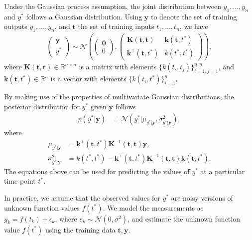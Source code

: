 \documentclass[journal]{IEEEtran}
\begin{document}
Under the Gaussian process assumption, the joint distribution between $y_1, \ldots, y_n$ and $y^*$ follows a Gaussian
distribution. Using $\mathbf{y}$ to denote the set of training outputs $y_1, \ldots, y_n$, and $\mathbf{t}$ the set
of training inputs $t_1, \ldots, t_n$, we have
\begin{align*}
\begin{pmatrix}
\mathbf{y}\\
y^*
\end{pmatrix}\sim
\mathcal{N}
\left(
\begin{pmatrix}
\mathbf{0}\\
0
\end{pmatrix},
\begin{pmatrix}
\mathbf{K}(\mathbf{t}, \mathbf{t}) & \mathbf{k}(\mathbf{t}, t^*)\\
\mathbf{k}^{\top}(\mathbf{t}, t^*) & k(t^*, t^*)
\end{pmatrix}
\right),
\end{align*}
where $\mathbf{K}(\mathbf{t}, \mathbf{t})\in \mathbb{R}^{n\times n}$ is a matrix with elements
$\{k(t_i, t_j)\}_{i=1, j=1}^{n,n}$, and $\mathbf{k}(\mathbf{t}, t^*) \in \mathbb{R}^n$ is a vector with elements
$\{k(t_i, t^*)\}_{i=1}^n$.

By making use of the properties of multivariate Gaussian distributions, the posterior distribution for $y^*$ given
$\mathbf{y}$ follows
\begin{align*}
p(y^*|\mathbf{y}) & =\mathcal{N}(y^*|\mu_{y^*|\mathbf{y}}, \sigma^2_{y^*|\mathbf{y}}),
\end{align*}
where
\begin{align*}
\mu_{y^*|\mathbf{y}} & = \mathbf{k}^{\top}(\mathbf{t}, t^*)\mathbf{K}^{-1}(\mathbf{t}, \mathbf{t})\mathbf{y},\\
\sigma^2_{y^*|\mathbf{y}} & = k(t^*, t^*) - \mathbf{k}^{\top}(\mathbf{t}, t^*)\mathbf{K}^{-1}(\mathbf{t}, \mathbf{t})
\mathbf{k}(\mathbf{t}, t^*).
\end{align*}
The equations above can be used for predicting the values of $y^*$ at a particular time point $t^*$.

In practice, we assume that the observed values for $y^*$ are noisy versions of unknown function values $f(t^*)$.
We model the measurements as $y_k = f(t_k) + \epsilon_k$, where $e_k\sim \mathcal{N}(0, \sigma^2)$, and estimate
the unknown function value $f(t^*)$ using the training data $\mathbf{t}, \mathbf{y}$.
\end{document}
